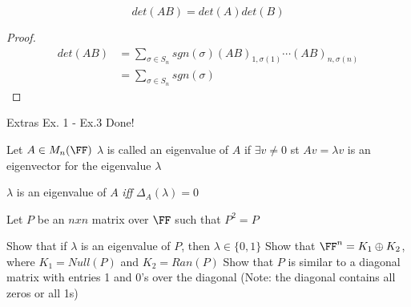 \documentclass[11pt]{scrartcl}
\begin{document}
\begin{theorem}
	\[
	det(AB) = det(A)det(B)
	\]
\end{theorem}

\begin{proof}
	\begin{align*}
		det(AB) &= \sum_{\sigma \in S_n} sgn(\sigma)(AB)_{1,\sigma(1)}\cdots(AB)_{n,\sigma(n)}\\
		&= \sum_{\sigma \in S_n} sgn(\sigma) 
	\end{align*}
\end{proof}


\begin{example}
	Extras Ex. 1 - Ex.3 Done!
\end{example}

\begin{definition}
	Let $A \in M_n(\FF)$ $\lambda$ is called an eigenvalue of $A$ if $\exists v \neq 0$ st $ Av = \lambda v$ is an eigenvector for the eigenvalue $\lambda$
\end{definition}

\begin{theorem}
	$\lambda$ is an eigenvalue of $A$ \emph{iff} $\Delta_A(\lambda) = 0$
\end{theorem}

\begin{example}
	Let $P$ be an $nxn$ matrix over $\FF$ such that $P^2 = P$
	\begin{enumerate}
		\ii
		Show that if $\lambda$ is an eigenvalue of $P$, then $\lambda \in \{0,1\}$
		\ii
		Show that $\FF^n = K_1 \oplus K_2$, where $K_1 = Null(P)$ and $K_2 = Ran(P)$
		\ii
		Show that $P$ is similar to a  diagonal matrix with entries 1 and 0's over the diagonal (Note: the diagonal contains all zeros or all 1s)
	\end{enumerate}
\end{example}
\end{document}
